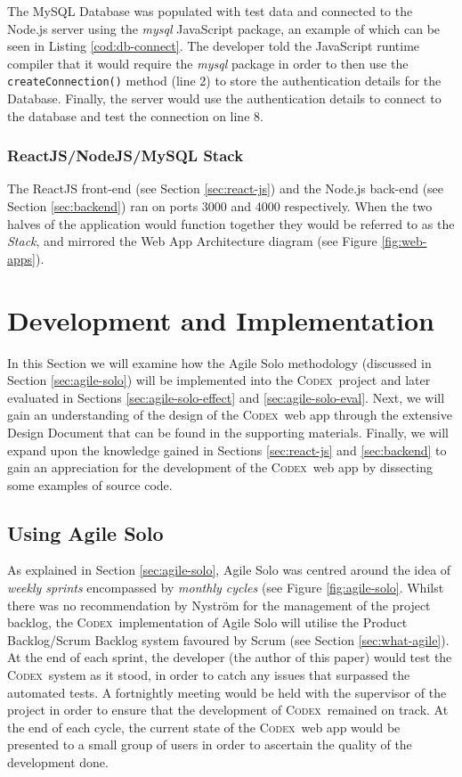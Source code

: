 \documentclass[final]{cmpreport}
\newcommand{\Codex}{\textsc{Codex}}
\begin{document}
			The MySQL Database was populated with test data and connected to the Node.js server using the \emph{mysql} JavaScript package, an example of which can be seen in Listing \ref{cod:db-connect}. The developer told the JavaScript runtime compiler that it would require the \textit{mysql} package in order to then use the \texttt{createConnection()} method (line 2) to store the authentication details for the Database. Finally, the server would use the authentication details to connect to the database and test the connection on line 8.
			
			\subsubsection{ReactJS/NodeJS/MySQL Stack} \label{sec:stack}
			The ReactJS front-end (see Section \ref{sec:react-js}) and the Node.js back-end (see Section \ref{sec:backend}) ran on ports 3000 and 4000 respectively. When the two halves of the application would function together they would be referred to as the \emph{Stack}, and mirrored the Web App Architecture diagram (see Figure \ref{fig:web-apps}). 
			
	\section{Development and Implementation} \label{sec:dev-and-imp}
	In this Section we will examine how the Agile Solo methodology (discussed in Section \ref{sec:agile-solo}) will be implemented into the \Codex \ project and later evaluated in Sections \ref{sec:agile-solo-effect} and \ref{sec:agile-solo-eval}. Next, we will gain an understanding of the design of the \Codex \ web app through the extensive Design Document that can be found in the supporting materials. Finally, we will expand upon the knowledge gained in Sections \ref{sec:react-js} and \ref{sec:backend} to gain an appreciation for the development of the \Codex \ web app by dissecting some examples of source code.
	
		\subsection{Using Agile Solo} \label{sec:use-agile-solo}
		As explained in Section \ref{sec:agile-solo}, Agile Solo was centred around the idea of \textit{weekly sprints} encompassed by \textit{monthly cycles} (see Figure \ref{fig:agile-solo}. Whilst there was no recommendation by Nystr{\"o}m for the management of the project backlog, the \Codex \ implementation of Agile Solo will utilise the Product Backlog/Scrum Backlog system favoured by Scrum (see Section \ref{sec:what-agile}). At the end of each sprint, the developer (the author of this paper) would test the \Codex \ system as it stood, in order to catch any issues that surpassed the automated tests. A fortnightly meeting would be held with the supervisor of the project in order to ensure that the development of \Codex \ remained on track. At the end of each cycle, the current state of the \Codex \ web app would be presented to a small group of users in order to ascertain the quality of the development done.
		
\end{document}
